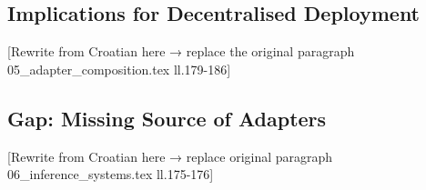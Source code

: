 \subsection{Implications for Decentralised Deployment}
\label{sec:composition:implications_reframe}

[Rewrite from Croatian here → replace the original paragraph 05_adapter_composition.tex ll.179-186]


%
%
%

\subsection{Gap: Missing Source of Adapters}
\label{sec:inference:gap_reframe}

[Rewrite from Croatian here → replace original paragraph 06_inference_systems.tex ll.175-176]


